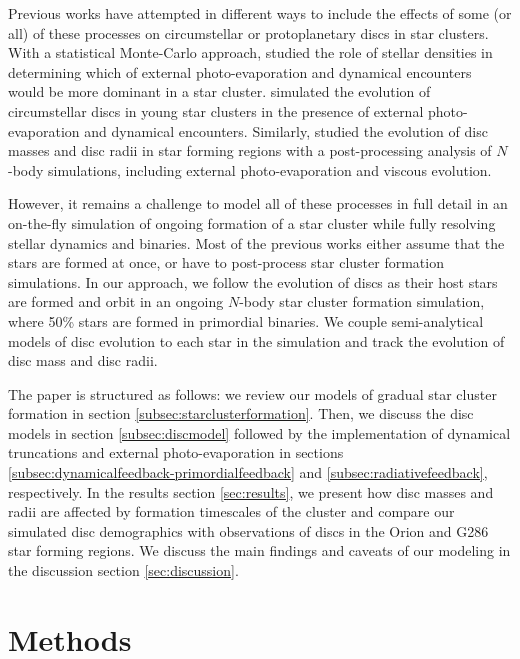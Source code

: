 \documentclass[fleqn,usenatbib]{mnras}
\begin{document}
Previous works have attempted in different ways to include the effects of some (or all) of these processes on circumstellar or protoplanetary discs in star clusters. With a statistical Monte-Carlo approach, \cite{Winter2018MNRAS.478.2700W} studied the role of stellar densities in determining which of external photo-evaporation and dynamical encounters would be more dominant in a star cluster. \cite{Concha2023MNRAS.520.6159C} simulated the evolution of circumstellar discs in young star clusters in the presence of external photo-evaporation and dynamical encounters. Similarly, \cite{Marchington2022MNRAS.515.5449M} studied the evolution of disc masses and disc radii in star forming regions with a post-processing analysis of $N$-body simulations, including external photo-evaporation and viscous evolution.

However, it remains a challenge to model all of these processes in full detail in an on-the-fly simulation of ongoing formation of a star cluster while fully resolving stellar dynamics and binaries. Most of the previous works either assume that the stars are formed at once, or have to post-process star cluster formation simulations. In our approach, we follow the evolution of discs as their host stars are formed and orbit in an ongoing $N$-body star cluster formation simulation, where 50\% stars are formed in primordial binaries. We couple semi-analytical models of disc evolution to each star in the simulation and track the evolution of disc mass and disc radii. 

The paper is structured as follows: we review our models of gradual star cluster formation in section \ref{subsec:starclusterformation}. Then, we discuss the disc models in section \ref{subsec:discmodel} followed by the implementation of dynamical truncations and external photo-evaporation in sections \ref{subsec:dynamicalfeedback-primordialfeedback} and \ref{subsec:radiativefeedback}, respectively. In the results section \ref{sec:results}, we present how disc masses and radii are affected by formation timescales of the cluster and compare our simulated disc demographics with observations of discs in the Orion and G286 star forming regions. We discuss the main findings and caveats of our modeling in the discussion section \ref{sec:discussion}. 

\section{Methods}
\label{sec:methods}
\end{document}
